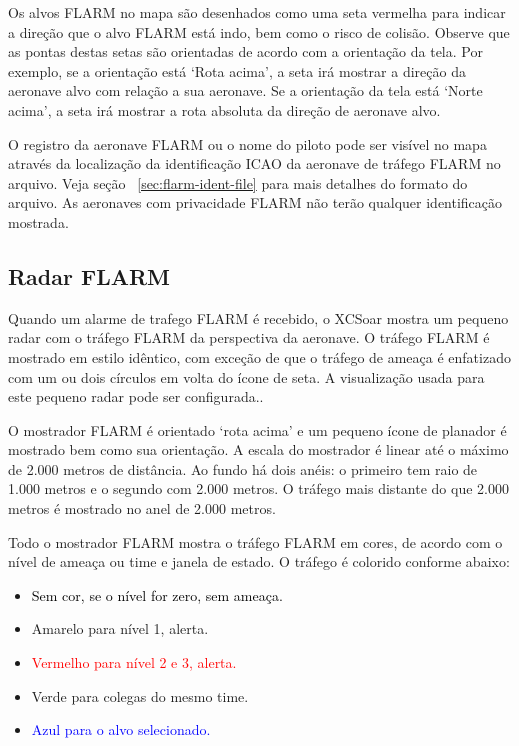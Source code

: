 Os alvos FLARM no mapa são desenhados como uma seta vermelha para indicar a direção que o alvo FLARM está indo, bem como o risco de colisão.   Observe que as pontas destas setas são orientadas de acordo com a orientação da tela.  Por exemplo, se a orientação está ‘Rota acima’, a seta irá mostrar a direção da aeronave alvo com relação a sua aeronave.  Se a orientação da tela está ‘Norte acima’, a seta irá mostrar a rota absoluta da direção de aeronave alvo. 

O registro da aeronave FLARM ou o nome do piloto pode ser visível no mapa através da localização da identificação ICAO da aeronave de tráfego FLARM no arquivo.  Veja seção ~\ref{sec:flarm-ident-file} para mais detalhes do formato do arquivo.  As aeronaves com privacidade FLARM não terão qualquer identificação mostrada. 

\subsection*{Radar FLARM}

Quando um alarme de trafego FLARM é recebido, o XCSoar mostra um pequeno radar com o tráfego FLARM da perspectiva da aeronave.  O tráfego FLARM é mostrado em estilo idêntico, com exceção de que o tráfego de ameaça é enfatizado com um ou dois círculos em volta do ícone de seta.  A visualização usada para este pequeno radar pode ser configurada..

O mostrador FLARM é orientado ‘rota acima’ e um pequeno ícone de planador é mostrado bem como sua orientação.  A escala do mostrador é linear até o máximo de 2.000 metros de distância.  Ao fundo há dois anéis: o primeiro tem raio de 1.000 metros e o segundo com 2.000 metros.  O tráfego mais distante do que 2.000 metros é mostrado no anel de 2.000 metros.

Todo o mostrador FLARM mostra o tráfego FLARM em cores, de acordo com o nível de ameaça ou time e janela de estado.  O tráfego é colorido conforme abaixo:
\begin{itemize}
\item \textcolor{black} {Sem cor, se o nível for zero, sem ameaça.} 
\item \textcolor{warning} { Amarelo para nível 1, alerta.}
\item \textcolor{red} {Vermelho para nível 2 e 3, alerta.}
\item \textcolor{teammate} {Verde para colegas do mesmo time.}
\item \textcolor{blue} {Azul para o alvo selecionado.}
\end{itemize}

